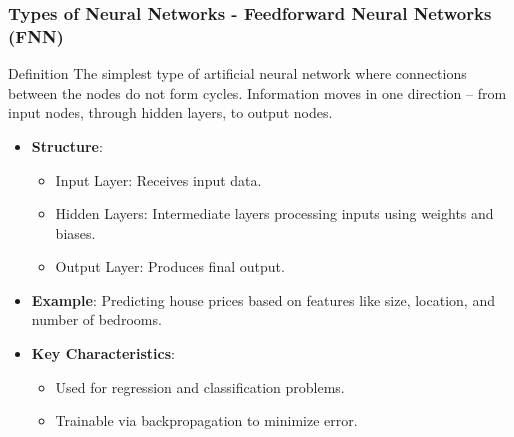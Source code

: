 \documentclass[aspectratio=169]{beamer}
\begin{document}
\begin{frame}[fragile]
    \frametitle{Types of Neural Networks - Feedforward Neural Networks (FNN)}
    \begin{block}{Definition}
        The simplest type of artificial neural network where connections between the nodes do not form cycles. Information moves in one direction – from input nodes, through hidden layers, to output nodes.
    \end{block}
    
    \begin{itemize}
        \item \textbf{Structure}:
        \begin{itemize}
            \item Input Layer: Receives input data.
            \item Hidden Layers: Intermediate layers processing inputs using weights and biases.
            \item Output Layer: Produces final output.
        \end{itemize}
        
        \item \textbf{Example}: Predicting house prices based on features like size, location, and number of bedrooms.
        
        \item \textbf{Key Characteristics}:
        \begin{itemize}
            \item Used for regression and classification problems.
            \item Trainable via backpropagation to minimize error.
        \end{itemize}
    \end{itemize}
\end{frame}
\end{document}
